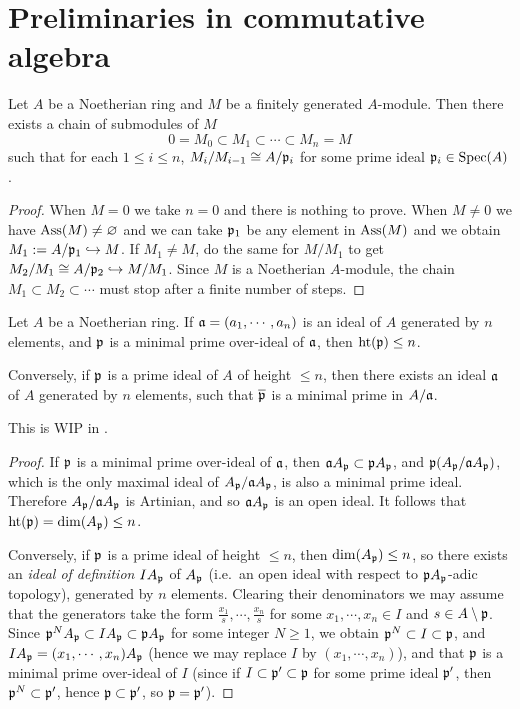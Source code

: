 \section{Preliminaries in commutative algebra}

\begin{prop}
\label{noeth-ring-filtration}
\leanok
Let $A$ be a Noetherian ring and $M$ be a finitely generated $A$-module.
Then there exists a chain of submodules of $M$
\[0 = M_0 \subset M_1 \subset \cdots \subset M_n = M\]
such that for each $1\leq i\leq n$, $M_i/M_{i-1} \cong A/{\mathfrak{p}}_i$ for some prime ideal ${\mathfrak{p}}_i\in{\mathrm{Spec}}(A)$.
\end{prop}

\begin{proof}
\leanok
When $M=0$ we take $n=0$ and there is nothing to prove.
When $M\neq 0$ we have $\operatorname{Ass}(M)\neq\varnothing$
and we can take ${\mathfrak{p}}_1$ be any element in $\operatorname{Ass}(M)$
and we obtain $M_1:=A/{\mathfrak{p}}_1\hookrightarrow M$.
If $M_1\neq M$, do the same for $M/M_1$ to get $M_2/M_1\cong A/{\mathfrak{p}}_2\hookrightarrow M/M_1$.
Since $M$ is a Noetherian $A$-module,
the chain $M_1\subset M_2\subset\cdots$ must stop after a finite number of steps.
\end{proof}

\begin{thm}
\label{krull-principal-ideal-thm}
Let $A$ be a Noetherian ring.
If ${\mathfrak{a}}=(a_1,\cdots,a_n)$ is an ideal of $A$ generated by $n$ elements,
and ${\mathfrak{p}}$ is a minimal prime over-ideal of ${\mathfrak{a}}$, then ${\mathrm{ht}}({\mathfrak{p}})\leq n$.

Conversely, if ${\mathfrak{p}}$ is a prime ideal of $A$ of height $\leq n$,
then there exists an ideal ${\mathfrak{a}}$ of $A$ generated by $n$ elements, such that
$\overline{{\mathfrak{p}}}$ is a minimal prime in $A/{\mathfrak{a}}$.
\end{thm}

This is WIP in .

\begin{proof}
If ${\mathfrak{p}}$ is a minimal prime over-ideal of ${\mathfrak{a}}$, then ${\mathfrak{a}} A_{\mathfrak{p}}\subset{\mathfrak{p}} A_{\mathfrak{p}}$,
and ${\mathfrak{p}}(A_{\mathfrak{p}}/{\mathfrak{a}} A_{\mathfrak{p}})$, which is the only maximal ideal of
$A_{\mathfrak{p}}/{\mathfrak{a}} A_{\mathfrak{p}}$, is also a minimal prime ideal.
Therefore $A_{\mathfrak{p}}/{\mathfrak{a}} A_{\mathfrak{p}}$ is Artinian, and so
${\mathfrak{a}} A_{\mathfrak{p}}$ is an open ideal. It follows that ${\mathrm{ht}}({\mathfrak{p}})=\dim(A_{\mathfrak{p}})\leq n$.

Conversely, if ${\mathfrak{p}}$ is a prime ideal of height $\leq n$,
then $\dim(A_{\mathfrak{p}})\leq n$, so there exists an \emph{ideal of definition}
$IA_{\mathfrak{p}}$ of $A_{\mathfrak{p}}$
(i.e.~an open ideal with respect to ${\mathfrak{p}} A_{\mathfrak{p}}$-adic topology),
generated by $n$ elements.
Clearing their denominators we may assume that the generators take the form
$\frac{x_1}s,\cdots,\frac{x_n}s$ for some $x_1,\cdots,x_n\in I$
and $s\in A\setminus{\mathfrak{p}}$.
Since ${\mathfrak{p}}^NA_{\mathfrak{p}}\subset IA_{\mathfrak{p}}\subset{\mathfrak{p}} A_{\mathfrak{p}}$ for some integer $N\geq 1$,
we obtain ${\mathfrak{p}}^N\subset I\subset{\mathfrak{p}}$, and
$IA_{\mathfrak{p}}=(x_1,\cdots,x_n)A_{\mathfrak{p}}$
(hence we may replace $I$ by $(x_1,\cdots,x_n)$), and that ${\mathfrak{p}}$ is a minimal prime over-ideal of $I$
(since if $I\subset{\mathfrak{p}}'\subset{\mathfrak{p}}$ for some prime ideal ${\mathfrak{p}}'$,
then ${\mathfrak{p}}^N\subset{\mathfrak{p}}'$, hence ${\mathfrak{p}}\subset{\mathfrak{p}}'$, so ${\mathfrak{p}}={\mathfrak{p}}'$).
\end{proof}


